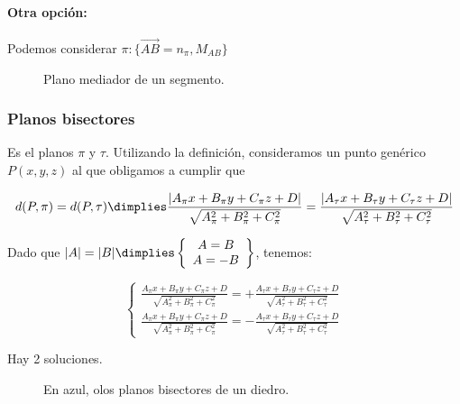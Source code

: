 \paragraph{Otra opción: } Podemos considerar $\pi:\{\vec{AB} = n_{\pi}, M_{AB}\}$ 

\begin{figure}[hbtp]
\centering
{}

\label{fig::plano-mediador}
\caption{Plano mediador de un segmento.}
\end{figure}



\subsubsection{Planos bisectores}

Es el  planos $\pi$ y $\tau$. 
%
Utilizando la definición, consideramos un punto genérico $P(x,y,z)$ al que obligamos a cumplir que 

\[d(P,\pi) = d(P,\tau) \dimplies \frac{|A_{\pi}x + B_{\pi}y+C_{\pi}z+D|}{\sqrt{A_{\pi}^2+B_{\pi}^2+C_{\pi}^2}} =  \frac{|A_{\tau}x + B_{\tau}y+C_{\tau}z+D|}{\sqrt{A_{\tau}^2+B_{\tau}^2+C_{\tau}^2}}\]

Dado que $|A| = |B| \dimplies \left\{\begin{array}{c}A=B\\A=-B\end{array}\right\}$, tenemos:

\[
\begin{cases}
\displaystyle\frac{A_{\pi}x + B_{\pi}y+C_{\pi}z+D}{\sqrt{A_{\pi}^2+B_{\pi}^2+C_{\pi}^2}} =  +\frac{A_{\tau}x + B_{\tau}y+C_{\tau}z+D}{\sqrt{A_{\tau}^2+B_{\tau}^2+C_{\tau}^2}}
\\
\displaystyle\frac{A_{\pi}x + B_{\pi}y+C_{\pi}z+D}{\sqrt{A_{\pi}^2+B_{\pi}^2+C_{\pi}^2}} = - \frac{A_{\tau}x + B_{\tau}y+C_{\tau}z+D}{\sqrt{A_{\tau}^2+B_{\tau}^2+C_{\tau}^2}}
\end{cases}
\]

Hay 2 soluciones.

\begin{figure}[hbtp]
\centering
{}

\label{fig::planos-bisectores}
\caption{En azul, olos planos bisectores de un diedro.}
\end{figure}

